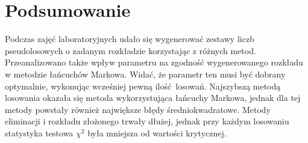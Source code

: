 \documentclass[a4paper,12pt]{article}
\begin{document}
    \section{Podsumowanie}

    Podczas zajęć laboratoryjnych udało się wygenerować zestawy liczb pseudolosowych o zadanym rozkładzie korzystając z różnych metod.
    Przeanalizowano także wpływ parametru na zgodność wygenerowanego rozkładu w metodzie łańcuchów Markowa.
    Widać, że parametr ten musi być dobrany optymalnie, wykonując wcześniej pewną ilość losowań.
    Najszybszą metodą losowania okazała się metoda wykorzystująca łańcuchy Markowa, jednak dla tej metody powstały również największe błędy średniokwadratowe.
    Metody eliminacji i rozkładu złożonego trwały dłużej, jednak przy każdym losowaniu statystyka testowa $\chi^2$ była mniejsza od wartości krytycznej.
 
\end{document}
